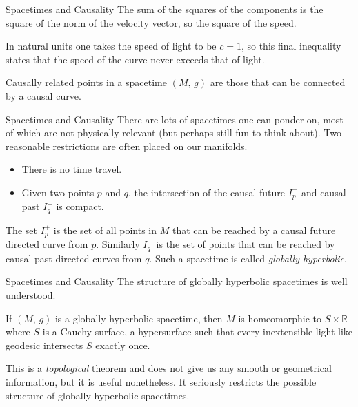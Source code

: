 \documentclass{beamer}
\begin{document}
    \begin{frame}{Spacetimes and Causality}
        The sum of the squares of the components is the square of the norm of
        the velocity vector, so the square of the speed.
        \par\hfill\par
        In natural units one takes the speed of light to be $c=1$, so this
        final inequality states that the speed of the curve never exceeds that
        of light.
        \par\hfill\par
        Causally related points in a spacetime $(M,\,g)$ are those that can be
        connected by a causal curve.
    \end{frame}
    \begin{frame}{Spacetimes and Causality}
        There are lots of spacetimes one can ponder on, most of which are
        not physically relevant (but perhaps still fun to think about). Two
        reasonable restrictions are often placed on our manifolds.
        \begin{itemize}
            \item There is no time travel.
            \item Given two points $p$ and $q$, the intersection of the causal
                  future $I_{p}^{+}$ and causal past $I_{q}^{-}$ is compact.
        \end{itemize}
        The set $I_{p}^{+}$ is the set of all points in $M$ that can be reached
        by a causal future directed curve from $p$. Similarly $I_{q}^{-}$ is
        the set of points that can be reached by causal past directed curves
        from $q$. Such a spacetime is called \textit{globally hyperbolic}.
    \end{frame}
    \begin{frame}{Spacetimes and Causality}
        The structure of globally hyperbolic spacetimes is well understood.
        \begin{theorem}
            If $(M,\,g)$ is a globally hyperbolic spacetime, then $M$ is
            homeomorphic to $S\times\mathbb{R}$ where $S$ is a Cauchy surface,
            a hypersurface such that every inextensible light-like geodesic
            intersects $S$ exactly once.
        \end{theorem}
        This is a \textit{topological} theorem and does not give us any smooth
        or geometrical information, but it is useful nonetheless. It seriously
        restricts the possible structure of globally hyperbolic spacetimes.
    \end{frame}
\end{document}
